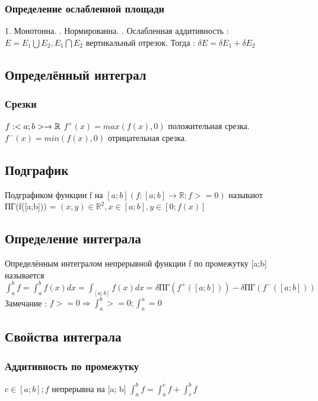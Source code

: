\documentclass[12pt, a4paper]{article}
\newcommand{\nl}{\newline}
\begin{document}
        \subsubsection{Определение ослабленной площади}
        1. Монотонна. \nl
        2. Нормированна. \nl
        3. Ослабленная аддитивность : $E = E_1 \bigcup E_2, E_1 \bigcap E_2$ вертикальный отрезок.\nl 
        Тогда : $\delta E = \delta E_1 + \delta E_2$
        
        
    \subsection{Определённый интеграл}
        \subsubsection{Срезки}
        
        $f : <a; b> \rightarrow \mathbb{R} \nl$
        $f^+(x) = max(f(x), 0)$ положительная срезка. \nl
        $f^-(x) = min(f(x), 0)$ отрицательная срезка. \nl
        
        \subsection{Подграфик}
        Подграфиком функции f на $[a; b] (f : [a;b]\rightarrow \mathbb{R}; f>=0)$ называют \nl
        ПГ(f([a;b])) = {$(x, y) \in \mathbb{R}^2, x \in [a; b], y \in [0; f(x)]$}
        
        \subsection{Определение интеграла}
        Определённым интегралом непрерывной функции f по промежутку [a;b] называется \nl
        $\int^b_a f = \int^b_a f(x) dx = \int_{[a; b]} f(x) dx = \delta \text{ПГ}(f^+([a; b])) - \delta \text{ПГ}(f^-([a; b]))$ \nl
        Замечание : $f>=0 \Rightarrow \int^b_a >=0; \int^a_a = 0$
        
        \subsection{Свойства интеграла}
        \subsubsection{Аддитивность по промежутку}
        $c \in [a;b]; f$ непрерывна на [a; b] \nl
        $\int_a^b f = \int_a^c f + \int^b_c f$ \nl
\end{document}
